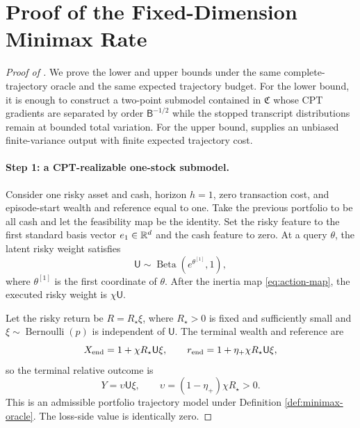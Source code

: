 \section{Proof of the Fixed-Dimension Minimax Rate}\label{app:minimax}

\begin{proof}[Proof of ]
We prove the lower and upper bounds under the same complete-trajectory oracle and the same expected trajectory budget.  For the lower bound, it is enough to construct a two-point submodel contained in $\mathfrak C$ whose CPT gradients are separated by order $\mathsf B^{-1/2}$ while the stopped transcript distributions remain at bounded total variation.  For the upper bound,  supplies an unbiased finite-variance output with finite expected trajectory cost.

\paragraph{Step 1: a CPT-realizable one-stock submodel.}
Consider one risky asset and cash, horizon $h=1$, zero transaction cost, and episode-start wealth and reference equal to one.  Take the previous portfolio to be all cash and let the feasibility map be the identity.  Set the risky feature to the first standard basis vector $e_1\in\mathbb R^d$ and the cash feature to zero.  At a query $\theta$, the latent risky weight satisfies
\[
 \mathsf U\sim\operatorname{Beta}(e^{\theta^{[1]}},1),
\]
where $\theta^{[1]}$ is the first coordinate of $\theta$.  After the inertia map \eqref{eq:action-map}, the executed risky weight is $\chi\mathsf U$.

Let the risky return be $R=R_\star\xi$, where $R_\star>0$ is fixed and sufficiently small and
$\xi\sim\operatorname{Bernoulli}(p)$ is independent of $\mathsf U$.  The terminal wealth and reference are
\[
 X_{\rm end}=1+\chi R_\star\mathsf U\xi,
 \qquad
 r_{\rm end}=1+\eta_+\chi R_\star\mathsf U\xi,
\]
so the terminal relative outcome is
\begin{equation}\label{eq:minimax-relative-outcome}
 Y=\upsilon\mathsf U\xi,
 \qquad
 \upsilon=(1-\eta_+)\chi R_\star>0.
\end{equation}
This is an admissible portfolio trajectory model under Definition \ref{def:minimax-oracle}.  The loss-side value is identically zero.


\end{proof}
